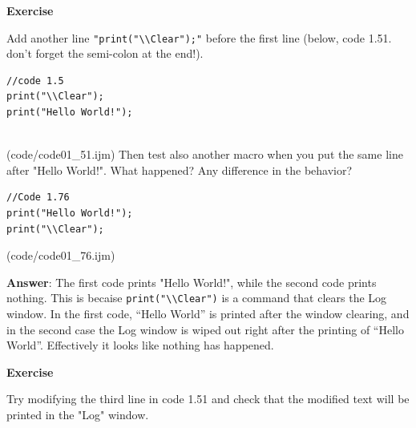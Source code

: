 \documentclass[11pt,a4paper,oneside]{report}
\newenvironment{indentexercise}[1]
{{\setlength{\leftmargin}{2em}}
\textbf{Exercise \thesubsection-#1}
\begin{list}{}
	\item
}
{\end{list}}
\newcommand{\ilcom}[1]{\texttt{\small#1}}
\begin{document}
\begin{indentexercise}{1}
\item Add another line \texttt{"print("\textbackslash{}\textbackslash{}Clear");"} 
before the first line (below, code 1.51. don't forget the semi-colon at the end!). 
\item 
\begin{lstlisting}
//code 1.5
print("\\Clear");
print("Hello World!");


\end{lstlisting}
(code/code01_51.ijm)
Then test also another macro when you put the same line after "Hello World!". 
What happened? Any difference in the behavior? 
\item 
\begin{lstlisting}
//Code 1.76
print("Hello World!");
print("\\Clear");
\end{lstlisting}
(code/code01_76.ijm)
\item \textbf{Answer}: The first code prints "Hello World!", while the second code prints nothing. This is becaise \ilcom{print("\textbackslash{}\textbackslash{}Clear")} is a command that clears the Log window. In the first code, ``Hello World'' is printed after the window clearing, and in the second case the Log window is wiped out right after the printing of ``Hello World''. Effectively it looks like nothing has happened.  
\end{indentexercise}

\begin{indentexercise}{2}
\item Try modifying the third line in code 1.51
and check that the modified text will be printed in the "Log" window. \\
\end{indentexercise}
\end{document}
